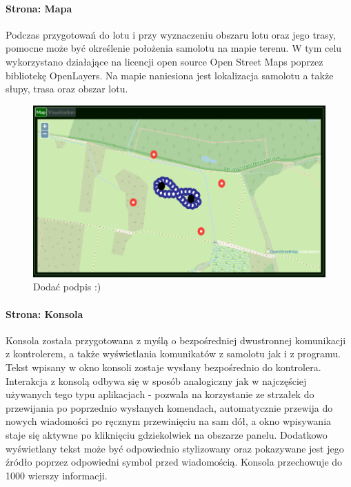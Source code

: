 \documentclass[12pt, a4paper]{article}
\begin{document}
\paragraph{Strona: Mapa}\mbox{}

Podczas przygotowań do lotu i przy wyznaczeniu obszaru lotu oraz jego trasy, pomocne może być określenie położenia samolotu na mapie terenu. W tym celu wykorzystano działające na licencji open source Open Street Maps poprzez bibliotekę OpenLayers. Na mapie naniesiona jest lokalizacja samolotu a także słupy, trasa oraz obszar lotu.

 \begin{figure}[H]
    \centering
    \includegraphics[width=1\textwidth]{mapa}
    \caption{Dodać podpis :)}
\end{figure}


\paragraph{Strona: Konsola}\mbox{}

Konsola została przygotowana z myślą o bezpośredniej dwustronnej komunikacji z kontrolerem, a także wyświetlania komunikatów z samolotu jak i z programu. Tekst wpisany w okno konsoli zostaje wysłany bezpośrednio do kontrolera. Interakcja z konsolą odbywa się w sposób analogiczny jak w najczęściej używanych tego typu aplikacjach - pozwala na korzystanie ze strzałek do przewijania po poprzednio wysłanych komendach, automatycznie przewija do nowych wiadomości po ręcznym przewinięciu na sam dół, a okno wpisywania staje się aktywne po kliknięciu gdziekolwiek na obszarze panelu. Dodatkowo wyświetlany tekst może być odpowiednio stylizowany oraz pokazywane jest jego źródło poprzez odpowiedni symbol przed wiadomością. Konsola przechowuje do 1000 wierszy informacji.
\end{document}
